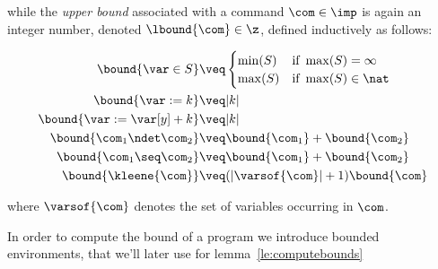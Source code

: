 \begin{definition}
  while the \emph{upper bound} associated with a command
  \(\com\in \imp\) is again an integer number, denoted
  \(\lbound{\com}\in \z\), defined inductively as follows:

  \begin{align*}
    \bound{\var \in S}  
    & \veq \begin{cases}
      \min(S) & \text{if } \max(S)=\infty\\
      \max(S) & \text{if } \max(S)\in \nat
    \end{cases}
    \\
    \bound{\var := k} 
    & \veq | k |\\
    \bound{\var := \var[y] + k}
    & \veq | k |\\
    \bound{\com_1 \ndet \com_2}
    & \veq \bound{\com_1} + \bound{\com_2}\\
    \bound{\com_1 \seq \com_2}
    & \veq \bound{\com_1} + \bound{\com_2}\\
    \bound{\kleene{\com}}
    & \veq (|\varsof{\com}|+1) \bound{\com} \\ 
  \end{align*}

  where \(\varsof{\com}\) denotes the set of variables occurring in 
  \(\com\).
\end{definition}

In order to compute the bound of a program we introduce bounded
environments, that we'll later use for lemma~\ref{le:computebounds}

